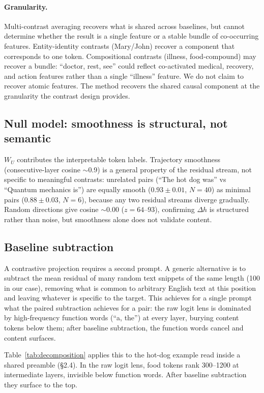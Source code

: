 \documentclass[11pt]{article}
\newcommand{\dhh}{\Delta h}
\newcommand{\WU}{W_U}
\begin{document}
\paragraph{Granularity.} Multi-contrast averaging recovers what is shared across
baselines, but cannot determine whether the result is a single feature or
a stable bundle of co-occurring features. Entity-identity contrasts
(Mary/John) recover a component that corresponds to one token.
Compositional contrasts (illness, food-compound) may recover a bundle:
``doctor, rest, see'' could reflect co-activated medical, recovery, and
action features rather than a single ``illness'' feature. We do not claim
to recover atomic features. The method recovers the shared causal
component at the granularity the contrast design provides.

\subsection{Null model: smoothness is structural, not semantic}

$\WU$ contributes the interpretable token labels. Trajectory smoothness
(consecutive-layer cosine $\sim$0.9) is a general property of the residual stream,
not specific to meaningful contrasts: unrelated pairs (``The hot dog was'' vs
``Quantum mechanics is'') are equally smooth ($0.93 \pm 0.01$, $N=40$) as minimal
pairs ($0.88 \pm 0.03$, $N=6$), because any two residual streams diverge gradually.
Random directions give cosine $\sim$0.00 ($z = 64$--$93$), confirming $\dhh$ is structured
rather than noise, but smoothness alone does not validate content.

\subsection{Baseline subtraction}

A contrastive projection requires a second prompt. A generic
alternative is to subtract the mean residual of many random text
snippets of the same length (100 in our case), removing what is
common to arbitrary English text at this position and leaving
whatever is specific to the target. This achieves for a single prompt
what the paired subtraction achieves for a pair: the raw logit lens
is dominated by high-frequency function words (``a, the'') at every
layer, burying content tokens below them; after baseline subtraction,
the function words cancel and content surfaces.

Table~\ref{tab:decomposition} applies this to the hot-dog example
read inside a shared preamble (\S2.4). In the raw logit lens, food
tokens rank 300--1200 at intermediate layers, invisible below function
words. After baseline subtraction they surface to the top.
\end{document}

